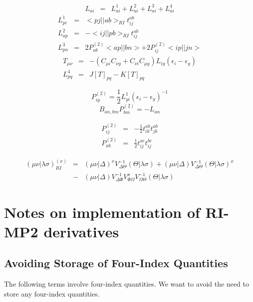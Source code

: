 \documentclass[fleqn,12pt]{article}
\newcommand{\half}{\frac{1}{2}}
\newcommand{\bra}{<\!}
\newcommand{\ket}{\!>}
\newcommand{\tijab}{{t_{ij}^{ab}}}
\newcommand{\Ptwo}{P^{(2)}}
\newcommand{\intari}[2]{\bra #1 || #2 \ket_{RI}}
\begin{document}
\begin{changebar}
\begin{eqnarray}
  L_{ai} & = & L^1_{ai} + L^2_{ai} + L^3_{ai} + L^4_{ai}
\end{eqnarray}
\begin{eqnarray}
  L^1_{pi} & = & \intari{pj}{ab} \tijab \\
  L^2_{ap} & = & - \intari{ij}{pb} \tijab \\
  L^3_{pn} & = & 2 \Ptwo_{ab} \bra ap || bn \ket + 2 \Ptwo_{ij} \bra ip
  || jn \ket 
\end{eqnarray}
\begin{eqnarray}
  T_{\mu \nu} & = & - \left(C_{\mu i} C_{\nu y} + C_{\nu i} C_{\mu y}
  \right) L_{iy} \left( \epsilon_i - \epsilon_y \right) \\ L^4_{pq} &
  = & J[T]_{pq} - K[T]_{pq}
\end{eqnarray}

\begin{equation}
  \Ptwo_{iy} = \half L^1_{yi} \left( \epsilon_i -  \epsilon_y  \right)^{-1}
\end{equation}
\begin{equation}
  B_{an,bm} \Ptwo_{bm} = -L_{an}
\end{equation}

\begin{eqnarray}
  \Ptwo_{ij} & = & -\half t_{ik}^{ab} t_{jk}^{ab} \\
  \Ptwo_{ab} & = & \half t_{ij}^{ac} t_{ij}^{bc} 
\end{eqnarray}

\begin{eqnarray}
( \mu\nu | \lambda\sigma )^{(x)}_{RI} & = &
   (\mu \nu | \Delta)^{x} V^{-1}_{\Delta\Theta} (\Theta | \lambda \sigma)
   + (\mu \nu | \Delta) V^{-1}_{\Delta\Theta} (\Theta | \lambda \sigma)^{x} \\
 & - & (\mu \nu | \Delta) V^{-1}_{\Delta\Phi} V^{x}_{\Phi\Omega}
             V^{-1}_{\Omega\Theta} (\Theta | \lambda \sigma) \nonumber
\end{eqnarray}

\section{Notes on implementation of RI-MP2 derivatives}

\subsection{Avoiding Storage of Four-Index Quantities}

The following terms involve four-index quantities.  We want to avoid
the need to store any four-index quantities.


\end{changebar}
\end{document}
